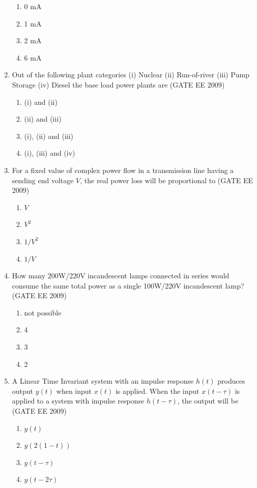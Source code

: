 \documentclass[journal,12pt,onecolumn]{IEEEtran}
\theoremstyle{remark}
\begin{document}
\begin{flushleft}
\begin{enumerate}
\begin{enumerate}
    \item  0 mA  
\item  1 mA  
\item  2 mA  
\item  6 mA

\end{enumerate}

\item Out of the following plant categories 
(i) Nuclear  (ii) Run-of-river  (iii) Pump Storage  (iv) Diesel 
the base load power plants are 
\hfill(GATE EE 2009)
\begin{enumerate}
    \item  (i) and (ii) 
\item  (ii) and (iii) 
\item  (i), (ii) and (iii) 
\item  (i), (iii) and (iv)
\end{enumerate}

\item For a fixed value of complex power flow in a transmission line having a sending end voltage $V$, the real power loss will be proportional to 
\hfill(GATE EE 2009)
\begin{enumerate}
\item  $V$  
\item  $V^2$  
\item  $1/V^2$  
\item  $1/V$ 
\end{enumerate}


\item How many 200W/220V incandescent lamps connected in series would consume the same total power as a single 100W/220V incandescent lamp?
\hfill(GATE EE 2009)
\begin{enumerate}
    \item not possible
    \item 4
    \item 3
    \item 2
\end{enumerate}


\item A Linear Time Invariant system with an impulse response $h(t)$ produces output $y(t)$ when input $x(t)$ is applied. When the input $x(t-\tau)$ is applied to a system with impulse response $h(t-\tau)$, the output will be
\hfill(GATE EE 2009)
\begin{enumerate}
    \item  $y(t)$
    \item $y(2(1-t))$
    \item $y(t-\tau)$
    \item $y(t-2\tau)$
\end{enumerate}



\end{enumerate}
\end{flushleft}
\end{document}
